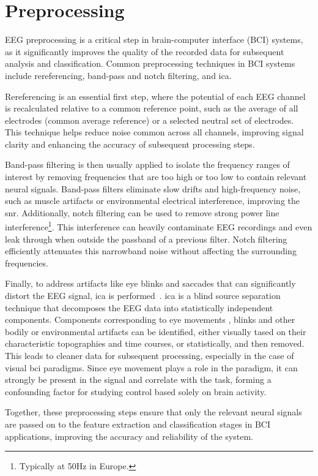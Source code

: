 \section{Preprocessing}%
\label{sec:bci/preprocessing}
EEG preprocessing is a critical step in brain-computer interface (BCI) systems, as it
significantly improves the quality of the recorded data for subsequent analysis and
classification. Common preprocessing techniques in BCI systems include
rereferencing, band-pass and notch filtering, and \ac{ica}.

Rereferencing is an essential first step, where the potential of each EEG channel is
recalculated relative to a common reference point, such as the average of all
electrodes (common average reference) or a selected neutral set of electrodes.
This technique helps reduce noise common across all channels, improving signal clarity
and enhancing the accuracy of subsequent processing steps.

Band-pass filtering is then usually applied to isolate the frequency ranges of interest by
removing frequencies that are too high or too low to contain relevant neural signals.
Band-pass filters eliminate slow drifts and high-frequency noise, such as
muscle artifacts or environmental electrical interference, improving the
\ac{snr}.
Additionally, notch filtering can be  used to remove strong power line
interference\footnote{Typically at 50Hz in Europe.}.
This interference can heavily contaminate EEG recordings and even leak through
when outside the passband of a previous filter.
Notch filtering efficiently attenuates this narrowband noise without affecting
the surrounding frequencies.

Finally, to address artifacts like eye blinks and saccades that can significantly
distort the EEG signal, \ac{ica} is
performed~\cite{Delorme2007}.
\Ac{ica} is a blind source separation technique that decomposes the EEG data into
statistically independent components. Components corresponding to eye movements
, blinks and other bodily or environmental artifacts can be identified, either
visually tased on their characteristic topographies and time courses, or
statistically, and then removed.
This leads to cleaner data for subsequent processing, especially in the case of
visual \ac{bci} paradigms.
Since eye movement plays a role in the paradigm, it can strongly be present in
the signal and correlate with the task, forming a confounding factor for
studying control based solely on brain activity.

Together, these preprocessing steps ensure that only the relevant neural signals are
passed on to the feature extraction and classification stages in BCI applications,
improving the accuracy and reliability of the system.


